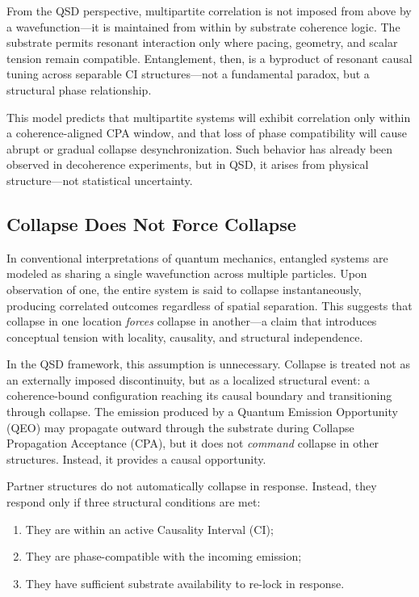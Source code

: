 \documentclass[preprints,article,submit,pdftex,moreauthors]{Definitions/mdpi}
\begin{document}
From the QSD perspective, multipartite correlation is not imposed from above by a wavefunction—it is maintained from within by substrate coherence logic. The substrate permits resonant interaction only where pacing, geometry, and scalar tension remain compatible. Entanglement, then, is a byproduct of resonant causal tuning across separable CI structures—not a fundamental paradox, but a structural phase relationship.

This model predicts that multipartite systems will exhibit correlation only within a coherence-aligned CPA window, and that loss of phase compatibility will cause abrupt or gradual collapse desynchronization. Such behavior has already been observed in decoherence experiments, but in QSD, it arises from physical structure—not statistical uncertainty.

\subsection{Collapse Does Not Force Collapse}

In conventional interpretations of quantum mechanics, entangled systems are modeled as sharing a single wavefunction across multiple particles. Upon observation of one, the entire system is said to collapse instantaneously, producing correlated outcomes regardless of spatial separation. This suggests that collapse in one location \emph{forces} collapse in another—a claim that introduces conceptual tension with locality, causality, and structural independence.

In the QSD framework, this assumption is unnecessary. Collapse is treated not as an externally imposed discontinuity, but as a localized structural event: a coherence-bound configuration reaching its causal boundary and transitioning through collapse. The emission produced by a Quantum Emission Opportunity (QEO) may propagate outward through the substrate during Collapse Propagation Acceptance (CPA), but it does not \emph{command} collapse in other structures. Instead, it provides a causal opportunity.

Partner structures do not automatically collapse in response. Instead, they respond only if three structural conditions are met:
\begin{enumerate}
    \item They are within an active Causality Interval (CI);
    \item They are phase-compatible with the incoming emission;
    \item They have sufficient substrate availability to re-lock in response.
\end{enumerate}
\end{document}
